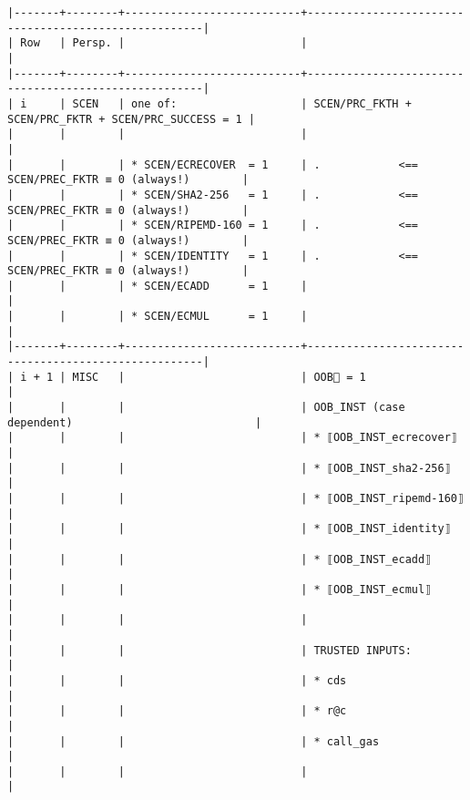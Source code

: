 \documentclass[varwidth=\maxdimen,margin=0.5cm,multi={verbatim}]{standalone}
\begin{document}
\begin{verbatim}
|-------+--------+---------------------------+------------------------------------------------------|
| Row   | Persp. |                           |                                                      |
|-------+--------+---------------------------+------------------------------------------------------|
| i     | SCEN   | one of:                   | SCEN/PRC_FKTH + SCEN/PRC_FKTR + SCEN/PRC_SUCCESS = 1 |
|       |        |                           |                                                      |
|       |        | * SCEN/ECRECOVER  = 1     | .            <== SCEN/PREC_FKTR ≡ 0 (always!)        |
|       |        | * SCEN/SHA2-256   = 1     | .            <== SCEN/PREC_FKTR ≡ 0 (always!)        |
|       |        | * SCEN/RIPEMD-160 = 1     | .            <== SCEN/PREC_FKTR ≡ 0 (always!)        |
|       |        | * SCEN/IDENTITY   = 1     | .            <== SCEN/PREC_FKTR ≡ 0 (always!)        |
|       |        | * SCEN/ECADD      = 1     |                                                      |
|       |        | * SCEN/ECMUL      = 1     |                                                      |
|-------+--------+---------------------------+------------------------------------------------------|
| i + 1 | MISC   |                           | OOB🏴 = 1                                            |
|       |        |                           | OOB_INST (case dependent)                            |
|       |        |                           | * ⟦OOB_INST_ecrecover⟧                               |
|       |        |                           | * ⟦OOB_INST_sha2-256⟧                                |
|       |        |                           | * ⟦OOB_INST_ripemd-160⟧                              |
|       |        |                           | * ⟦OOB_INST_identity⟧                                |
|       |        |                           | * ⟦OOB_INST_ecadd⟧                                   |
|       |        |                           | * ⟦OOB_INST_ecmul⟧                                   |
|       |        |                           |                                                      |
|       |        |                           | TRUSTED INPUTS:                                      |
|       |        |                           | * cds                                                |
|       |        |                           | * r@c                                                |
|       |        |                           | * call_gas                                           |
|       |        |                           |                                                      |

\end{verbatim}
\end{document}
